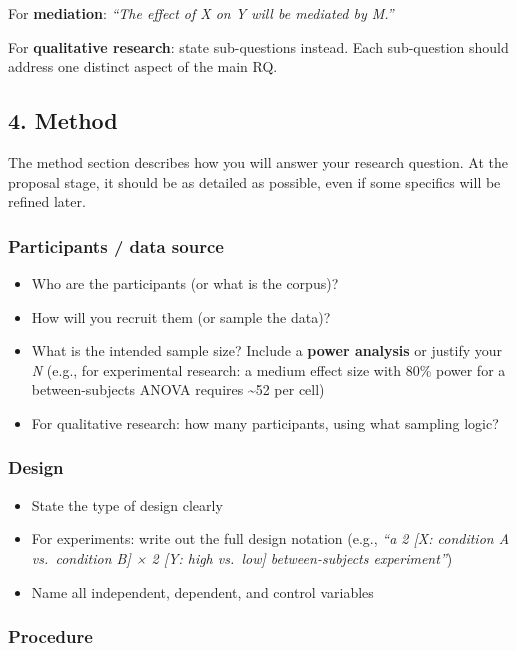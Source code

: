 \documentclass[
  11pt,
  a4paper,
]{scrbook}
\providecommand{\tightlist}{%
  \setlength{\itemsep}{0pt}\setlength{\parskip}{0pt}}\usepackage{longtable,booktabs,array}
\begin{document}
For \textbf{mediation}: \emph{``The effect of X on Y will be mediated by
M.''}

For \textbf{qualitative research}: state sub-questions instead. Each
sub-question should address one distinct aspect of the main RQ.

\subsection{4. Method}\label{method}

The method section describes how you will answer your research question.
At the proposal stage, it should be as detailed as possible, even if
some specifics will be refined later.

\subsubsection{Participants / data
source}\label{participants-data-source}

\begin{itemize}
\tightlist
\item
  Who are the participants (or what is the corpus)?
\item
  How will you recruit them (or sample the data)?
\item
  What is the intended sample size? Include a \textbf{power analysis} or
  justify your \emph{N} (e.g., for experimental research: a medium
  effect size with 80\% power for a between-subjects ANOVA requires
  \textasciitilde52 per cell)
\item
  For qualitative research: how many participants, using what sampling
  logic?
\end{itemize}

\subsubsection{Design}\label{design}

\begin{itemize}
\tightlist
\item
  State the type of design clearly
\item
  For experiments: write out the full design notation (e.g., \emph{``a 2
  {[}X: condition A vs.~condition B{]} × 2 {[}Y: high vs.~low{]}
  between-subjects experiment''})
\item
  Name all independent, dependent, and control variables
\end{itemize}

\subsubsection{Procedure}\label{procedure}
\end{document}
